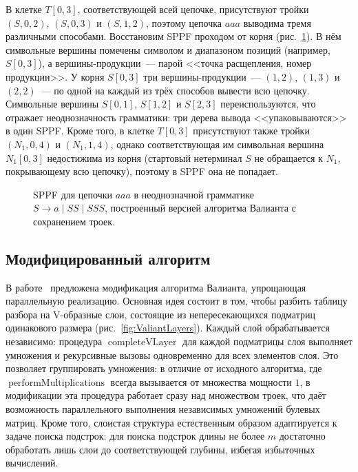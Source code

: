 \begin{example}
  В клетке $T[0,3]$, соответствующей всей цепочке, присутствуют тройки $(S, 0, 2)$, $(S, 0, 3)$ и $(S, 1, 2)$, поэтому цепочка $a a a$ выводима тремя различными способами.
  Восстановим SPPF проходом от корня (рис.~\ref{fig:Valiant_sppf}).
  В нём символьные вершины помечены символом и диапазоном позиций (например, $S [0,3]$), а вершины-продукции~--- парой <<точка расщепления, номер продукции>>.
  У корня $S [0,3]$ три вершины-продукции~--- $(1,2)$, $(1,3)$ и $(2,2)$~--- по одной на каждый из трёх способов вывести всю цепочку.
  Символьные вершины $S [0,1]$, $S [1,2]$ и $S [2,3]$ переиспользуются, что отражает неоднозначность грамматики: три дерева вывода <<упаковываются>> в один SPPF.
  Кроме того, в клетке $T[0,3]$ присутствуют также тройки $(N_1, 0, 4)$ и $(N_1, 1, 4)$, однако соответствующая им символьная вершина $N_1 [0,3]$ недостижима из корня (стартовый нетерминал $S$ не обращается к $N_1$, покрывающему всю цепочку), поэтому в SPPF она не попадает.

  \begin{figure}
    \begin{center}
      \resizebox{0.8\textwidth}{!}{}
    \end{center}
    \caption{SPPF для цепочки $a a a$ в неоднозначной грамматике $S \to a \mid S S \mid S S S$, построенный версией алгоритма Валианта с сохранением троек.}
    \label{fig:Valiant_sppf}
  \end{figure}
\end{example}

\subsection{Модифицированный алгоритм}

В работе~ предложена модификация алгоритма Валианта, упрощающая параллельную реализацию.
Основная идея состоит в том, чтобы разбить таблицу разбора на V-образные слои, состоящие из непересекающихся подматриц одинакового размера (рис.~\ref{fig:ValiantLayers}).
Каждый слой обрабатывается независимо: процедура $\operatorname{completeVLayer}$ для каждой подматрицы слоя выполняет умножения и рекурсивные вызовы одновременно для всех элементов слоя.
Это позволяет группировать умножения: в отличие от исходного алгоритма, где $\operatorname{performMultiplications}$ всегда вызывается от множества мощности $1$, в модификации эта процедура работает сразу над множеством троек, что даёт возможность параллельного выполнения независимых умножений булевых матриц.
Кроме того, слоистая структура естественным образом адаптируется к задаче поиска подстрок: для поиска подстрок длины не более $m$ достаточно обработать лишь слои до соответствующей глубины, избегая избыточных вычислений.

